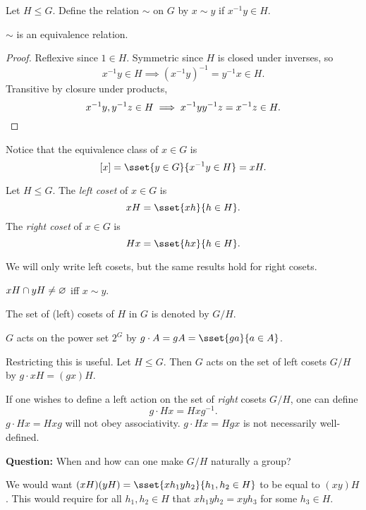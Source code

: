 \begin{definition}
    Let $H \le G$.
    Define the relation $\sim$ on $G$ by $x \sim y$ if $x^{-1}y \in H$.
\end{definition}
\begin{lemma}
    $\sim$ is an equivalence relation.
\end{lemma}
\begin{proof}
    Reflexive since $1 \in H$.
    Symmetric since $H$ is closed under inverses, so \[
        x^{-1}y \in H \implies (x^{-1}y)^{-1} = y^{-1}x \in H.
    \] Transitive by closure under products, \[
        x^{-1}y, y^{-1}z \in H \implies x^{-1}y y^{-1}z = x^{-1}z \in H.
        \qedhere
    \]
\end{proof}
Notice that the equivalence class of $x \in G$ is \[
    [x] = \sset{y \in G}{x^{-1}y \in H} = xH.
\]
\begin{definition*}[coset] \label{def:coset}
    Let $H \le G$.
    The \emph{left coset} of $x \in G$ is \[
        xH = \sset{xh}{h \in H}.
    \] The \emph{right coset} of $x \in G$ is \[
        Hx = \sset{hx}{h \in H}.
    \]
\end{definition*}
We will only write left cosets, but the same results hold for right cosets.
\begin{corollary}
    $xH \cap yH \ne \varnothing$ iff $x \sim y$.
\end{corollary}

\begin{definition*}
    The set of (left) cosets of $H$ in $G$ is denoted by $G/H$.
\end{definition*}

\begin{examples}
    \item $G$ acts on the power set $2^G$ by
        $g \cdot A = gA = \sset{ga}{a \in A}$.
    \item Restricting this is useful.
        Let $H \le G$.
        Then $G$ acts on the set of left cosets $G/H$ by
        $g \cdot xH = (gx)H$.
    \item If one wishes to define a left action on the set of \emph{right}
    cosets $G/H$, one can define \[
        g \cdot Hx = Hxg^{-1}.
    \] $g \cdot Hx = Hxg$ will not obey associativity.
    $g \cdot Hx = Hgx$ is not necessarily well-defined.
\end{examples}

\textbf{Question:} When and how can one make $G/H$ naturally a group?

We would want $(xH) (yH) = \sset{xh_1 yh_2}{h_1, h_2 \in H}$ to
be equal to $(xy)H$.
This would require for all $h_1, h_2 \in H$ that $xh_1yh_2 = xyh_3$
for some $h_3 \in H$.

